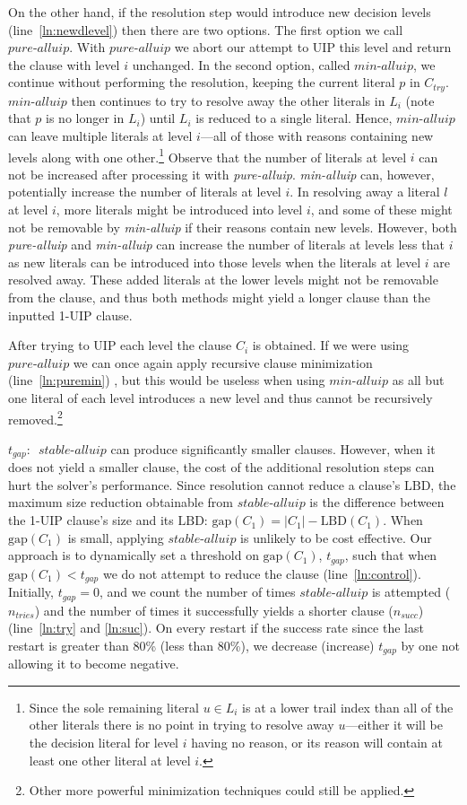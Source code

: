 \documentclass[runningheads]{llncs}
\newcommand{\oneuip}{1-UIP\xspace}
\newcommand{\LBD}{\text{LBD}\xspace}
\newcommand{\gap}{\text{gap}}
\newcommand{\tgap}{t_{\mathit{gap}}}
\newcommand{\ntries}{n_{\mathit{tries}}}
\newcommand{\nsuc}{n_{\mathit{succ}}}
\newcommand{\stablealluip}{\textit{stable-alluip}\xspace}
\newcommand{\allUipPure}{\textit{pure-alluip}\xspace}
\newcommand{\allUipMin}{\textit{min-alluip}\xspace}
\newcommand{\ctry}{C_{\mathit{try}}}
\begin{document}
On the other hand, if the resolution step would introduce new decision
levels (line~\ref{ln:newdlevel}) then there are two options.  The
first option we call $\allUipPure$. With $\allUipPure$ we abort our
attempt to UIP this level and return the clause with level $i$
unchanged. In the second option, called $\allUipMin$, we continue
without performing the resolution, keeping the current literal $p$ in
$\ctry$. $\allUipMin$ then continues to try to resolve away the other
literals in $L_i$ (note that $p$ is no longer in $L_i$) until $L_i$ is
reduced to a single literal. Hence, $\allUipMin$ can leave multiple
literals at level $i$---all of those with reasons containing new
levels along with one other.\footnote{Since the sole remaining literal
  $u\in L_i$ is at a lower trail index than all of the other literals
  there is no point in trying to resolve away $u$---either it will be
  the decision literal for level $i$ having no reason, or its reason
  will contain at least one other literal at level $i$.} Observe that
the number of literals at level $i$ can not be increased after
processing it with \allUipPure. \allUipMin can, however, potentially
increase the number of literals at level $i$. In resolving away a
literal $l$ at level $i$, more literals might be introduced into level
$i$, and some of these might not be removable by \allUipMin if their
reasons contain new levels. However, both \allUipPure and \allUipMin
can increase the number of literals at levels less that $i$ as new
literals can be introduced into those levels when the literals at
level $i$ are resolved away. These added literals at the lower levels
might not be removable from the clause, and thus both methods might
yield a longer clause than the inputted \oneuip clause.

After trying to UIP each level the clause $C_i$ is obtained. If we
were using $\allUipPure$ we can once again apply recursive clause
minimization (line~\ref{ln:puremin})
\cite{DBLP:conf/sat/SorenssonB09}, but this would be useless when
using $\allUipMin$ as all but one literal of each level introduces a
new level and thus cannot be recursively removed.\footnote{Other more
  powerful minimization techniques could still be applied.}


\noindent\textbf{$\tgap$}:\,\,
$\stablealluip$ can produce significantly smaller clauses. However,
when it does not yield a smaller clause, the cost of the additional
resolution steps can hurt the solver's performance. Since resolution
cannot reduce a clause's $\LBD$, the maximum size reduction obtainable
from $\stablealluip$ is the difference between the \oneuip clause's
size and its $\LBD$: $\gap(C_1) = |C_1| - \LBD(C_1)$. When $\gap(C_1)$
is small, applying $\stablealluip$ is unlikely to be cost
effective. Our approach is to dynamically set a threshold on
$\gap(C_1)$, $\tgap$, such that when $\gap(C_1) < \tgap$ we do not
attempt to reduce the clause (line~\ref{ln:control}). Initially,
$\tgap = 0$, and we count the number of times $\stablealluip$ is
attempted ($\ntries$) and the number of times it successfully yields a
shorter clause ($\nsuc$) (line~\ref{ln:try} and \ref{ln:suc}). On
every restart if the success rate since the last restart is greater
than 80\% (less than 80\%), we decrease (increase) $\tgap$ by one
not allowing it to become negative.
\end{document}
